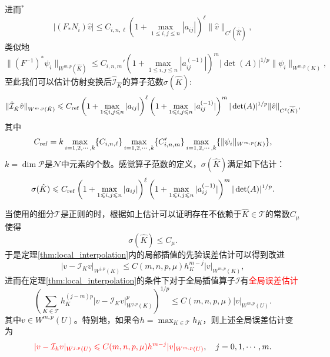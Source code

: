 \documentclass[a4paper,10pt]{ctexart}
\begin{document}
进而$ ^* $
\begin{equation}
    |(F_*N_i)\hat{v}| \leqslant C_{i,n,\ell} \left( 1+\max_{1\leqslant i,j\leqslant n}|a_{ij}| \right)^\ell \| \hat{v} \|_{C^\ell(\overline{\hat{K}})},
\end{equation}
类似地
\begin{equation}
    \| (F^{-1})^*\psi_i \|_{W^{m,p}(\hat{K})} \leqslant C_{i,n,m}' \left( 1+\max_{1\leqslant i,j\leqslant n}|a^{(-1)}_{ij}| \right)^m|\det(A)|^{1 / p} \| \psi_i \|_{W^{m,p}(K)},
\end{equation}
至此我们可以估计仿射变换后$ \hat{\mathcal{I}}_{\hat{K}} $的算子范数$ \sigma(\hat{K}) $:
\begin{equation}
    \| \hat{\mathcal{I}}_{\hat{K}} \hat{v} \|_{W^{m,p}(\hat{K})} \leqslant C_{\rm ref}\left( 1+\max_{1\leqslant i,j\leqslant n}|a_{ij}| \right)^\ell \left( 1+\max_{1\leqslant i,j\leqslant n}|a^{(-1)}_{ij}| \right)^m|\det(A)|^{1 / p}\| \hat{v} \|_{C^\ell(\overline{\hat{K}})},
\end{equation}
其中
\[
    C_{\rm ref} = k \max_{i=1,2,\cdots ,k}\{C_{i,n,\ell}\}\max_{i=1,2,\cdots ,k}\{C_{i,n,m}'\}\max_{i=1,2,\cdots ,k}\{\| \psi_i \|_{W^{m,p}(K)} \},
\]
$ k=\dim \mathcal{P} $是$ \mathcal{N} $中元素的个数。感觉算子范数的定义，$ \sigma(\hat{K}) $满足如下估计：
\begin{equation}
    \sigma(\hat{K}) \leqslant C_{\rm ref}\left( 1+\max_{1\leqslant i,j\leqslant n}|a_{ij}| \right)^\ell \left( 1+\max_{1\leqslant i,j\leqslant n}|a^{(-1)}_{ij}| \right)^m|\det(A)|^{1 / p}.
\end{equation}

当使用的细分$ \mathcal{T} $是正则的时，根据如上估计可以证明存在不依赖于$ \hat{K}\in \mathcal{T} $的常数$ C_\mu $使得
\[
    \sigma(\hat{K}) \leqslant C_\mu.
\]
于是定理\ref{thm:local_interpolation}内的局部插值的先验误差估计可以得到改进
\begin{equation}
    |v-\mathcal{I}_Kv|_{W^{j,p}(K)} \leqslant C(m,n,p,\mu)h_K^{m-j} |v|_{W^{m,p}(K)},
\end{equation}
进而在定理\ref{thm:local_interpolation}的条件下对于全局插值算子$ \mathcal{I} $有\textcolor{red}{全局误差估计}
\begin{equation}
    \left( \sum_{K\in \mathcal{T}}h_K^{(j-m)p}|v-\mathcal{I}_Kv|_{W^{j,p}(K)}^p \right)^{1 / p} \leqslant C(m,n,p,\mu) |v|_{W^{m,p}(U)}.
\end{equation}
其中$ v\in W^{m,p}(U) $。特别地，如果令$ h = \max_{K\in \mathcal{T}}h_K $，则上述全局误差估计变为
\begin{equation}
    \textcolor{red}{|v-\mathcal{I}_hv|_{W^{j,p}(U)} \leqslant C(m,n,p,\mu)h^{m-j} |v|_{W^{m,p}(U)}},\quad j=0,1,\cdots ,m.
\end{equation}
\end{document}
